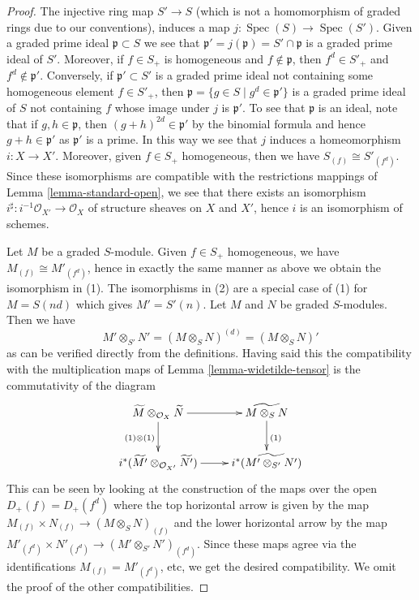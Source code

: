 \documentclass{stacks-project}
\theoremstyle{plain}
\theoremstyle{definition}
\theoremstyle{remark}
\numberwithin{equation}{subsection}
\def\Spec{\mathop{\mathrm{Spec}}}
\begin{document}
\begin{proof}
The injective ring map $S' \to S$ (which is not a homomorphism of graded rings
due to our conventions), induces a map $j : \Spec(S) \to \Spec(S')$.
Given a graded prime ideal $\mathfrak p \subset S$ we see that
$\mathfrak p' = j(\mathfrak p) = S' \cap \mathfrak p$
is a graded prime ideal of $S'$.
Moreover, if $f \in S_+$ is homogeneous and $f \not \in \mathfrak p$, then
$f^d \in S'_+$ and $f^d \not \in \mathfrak p'$. Conversely, if
$\mathfrak p' \subset S'$ is a graded prime ideal not containing some
homogeneous element $f \in S'_+$, then
$\mathfrak p = \{g \in S \mid g^d \in \mathfrak p'\}$ is a
graded prime ideal of $S$ not containing $f$ whose image under $j$
is $\mathfrak p'$. To see that $\mathfrak p$ is an ideal, note
that if $g, h \in \mathfrak p$, then
$(g + h)^{2d} \in \mathfrak p'$ by the binomial formula
and hence $g + h \in \mathfrak p'$ as $\mathfrak p'$ is a prime.
In this way we see that $j$ induces a homeomorphism $i : X \to X'$.
Moreover, given $f \in S_+$ homogeneous, then we have
$S_{(f)} \cong S'_{(f^d)}$. Since these isomorphisms are compatible
with the restrictions mappings of
Lemma \ref{lemma-standard-open}, we see that there exists an
isomorphism $i^\sharp : i^{-1}\mathcal{O}_{X'} \to \mathcal{O}_X$ of
structure sheaves on $X$ and $X'$, hence $i$ is an isomorphism
of schemes.

\medskip\noindent
Let $M$ be a graded $S$-module. Given $f \in S_+$ homogeneous, we have
$M_{(f)} \cong M'_{(f^d)}$, hence in exactly the same manner as above
we obtain the isomorphism in (1). The isomorphisms in (2) are a special
case of (1) for $M = S(nd)$ which gives $M' = S'(n)$. Let $M$ and $N$
be graded $S$-modules. Then we have
$$
M' \otimes_{S'} N' =
(M \otimes_S N)^{(d)} =
(M \otimes_S N)'
$$
as can be verified directly from the definitions. Having said this
the compatibility with the multiplication maps of
Lemma \ref{lemma-widetilde-tensor} is the commutativity of the diagram
$$
\xymatrix{
\widetilde M \otimes_{\mathcal{O}_X} \widetilde N
\ar[d]_{(1) \otimes (1)} \ar[r] &
\widetilde{M \otimes_S N} \ar[d]^{(1)} \\
i^*(\widetilde{M'} \otimes_{\mathcal{O}_{X'}} \widetilde{N'}) \ar[r] &
i^*(\widetilde{M' \otimes_{S'} N'})
}
$$
This can be seen by looking at the construction of the maps
over the open $D_+(f) = D_+(f^d)$ where the top horizontal
arrow is given by the map
$M_{(f)} \times N_{(f)} \to (M \otimes_S N)_{(f)}$
and the lower horizontal arrow by the map
$M'_{(f^d)} \times N'_{(f^d)} \to (M' \otimes_{S'} N')_{(f^d)}$.
Since these maps agree via the identifications
$M_{(f)} = M'_{(f^d)}$, etc, we get the desired compatibility.
We omit the proof of the other compatibilities.
\end{proof}
\end{document}
